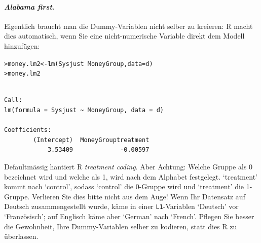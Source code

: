 \documentclass[oneside, 10pt]{book}\usepackage[]{graphicx}\usepackage[]{xcolor}
\makeatletter
\newcommand{\hlopt}[1]{\textcolor[rgb]{0,0,0}{#1}}%
\newcommand{\hlstd}[1]{\textcolor[rgb]{0.345,0.345,0.345}{#1}}%
\newcommand{\hlkwb}[1]{\textcolor[rgb]{0.69,0.353,0.396}{#1}}%
\newcommand{\hlkwc}[1]{\textcolor[rgb]{0.333,0.667,0.333}{#1}}%
\newcommand{\hlkwd}[1]{\textcolor[rgb]{0.737,0.353,0.396}{\textbf{#1}}}%
\newenvironment{kframe}{%
 \def\at@end@of@kframe{}%
 \ifinner\ifhmode%
  \def\at@end@of@kframe{\end{minipage}}%
  \begin{minipage}{\columnwidth}%
 \fi\fi%
 \def\FrameCommand##1{\hskip\@totalleftmargin \hskip-\fboxsep
 \colorbox{shadecolor}{##1}\hskip-\fboxsep
     \hskip-\linewidth \hskip-\@totalleftmargin \hskip\columnwidth}%
 \MakeFramed {\advance\hsize-\width
   \@totalleftmargin\z@ \linewidth\hsize
   \@setminipage}}%
 {\par\unskip\endMakeFramed%
 \at@end@of@kframe}
\newenvironment{knitrout}{}{} %
\makeatother
\begin{document}
\paragraph{\textit{Alabama first}.}
Eigentlich braucht man die Dummy-Variablen
nicht selber zu kreieren: R macht dies automatisch, wenn Sie eine
nicht-numerische Variable direkt dem Modell hinzufügen:
\begin{knitrout}
\color{fgcolor}\begin{kframe}
\begin{alltt}
\hlstd{> }\hlstd{money.lm2} \hlkwb{<-} \hlkwd{lm}\hlstd{(Sysjust} \hlopt{~} \hlstd{MoneyGroup,} \hlkwc{data} \hlstd{= d)}
\hlstd{> }\hlstd{money.lm2}
\end{alltt}
\begin{verbatim}

Call:
lm(formula = Sysjust ~ MoneyGroup, data = d)

Coefficients:
        (Intercept)  MoneyGrouptreatment  
            3.53409             -0.00597  
\end{verbatim}
\end{kframe}
\end{knitrout}
Defaultmässig hantiert R \textit{treatment coding}. Aber Achtung:
Welche Gruppe als 0 bezeichnet wird und welche als 1, wird
nach dem Alphabet festgelegt. `treatment' kommt nach `control',
sodass `control' die 0-Gruppe wird und `treatment' die 1-Gruppe.
Verlieren Sie dies bitte nicht aus dem Auge!
Wenn Ihr Datensatz
auf Deutsch zusammengestellt wurde, käme in einer \texttt{L1}-Variablen
`Deutsch' vor `Französisch'; auf Englisch käme aber
`German' nach `French'.\label{sec:alphabet}
Pflegen Sie besser die Gewohnheit,
Ihre Dummy-Variablen selber zu kodieren, statt dies R zu überlassen.
\end{document}
